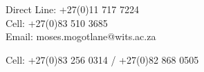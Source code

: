 






\begin{no}




Direct Line: +27(0)11 717 7224\\
Cell: +27(0)83 510 3685\\
Email: moses.mogotlane@wits.ac.za

\divider




\begin{no}
Cell: +27(0)83 256 0314 / +27(0)82 868 0505\\
\end{no}

\end{no}


